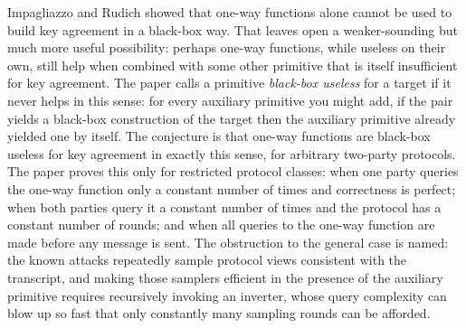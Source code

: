 \documentclass{conjura-conjecture}
\begin{document}

\vspace{0.4em}

\begin{informalconjecture}
Impagliazzo and Rudich showed that one-way functions alone cannot be used
to build key agreement in a black-box way. That leaves open a
weaker-sounding but much more useful possibility: perhaps one-way
functions, while useless on their own, still help when combined with some
other primitive that is itself insufficient for key agreement. The paper
calls a primitive \emph{black-box useless} for a target if it never helps
in this sense: for every auxiliary primitive you might add, if the pair
yields a black-box construction of the target then the auxiliary
primitive already yielded one by itself. The conjecture is that one-way
functions are black-box useless for key agreement in exactly this sense,
for arbitrary two-party protocols. The paper proves this only for
restricted protocol classes: when one party queries the one-way function
only a constant number of times and correctness is perfect; when both
parties query it a constant number of times and the protocol has a
constant number of rounds; and when all queries to the one-way function
are made before any message is sent. The obstruction to the general case
is named: the known attacks repeatedly sample protocol views consistent
with the transcript, and making those samplers efficient in the presence
of the auxiliary primitive requires recursively invoking an inverter,
whose query complexity can blow up so fast that only constantly many
sampling rounds can be afforded.
\end{informalconjecture}
\end{document}
